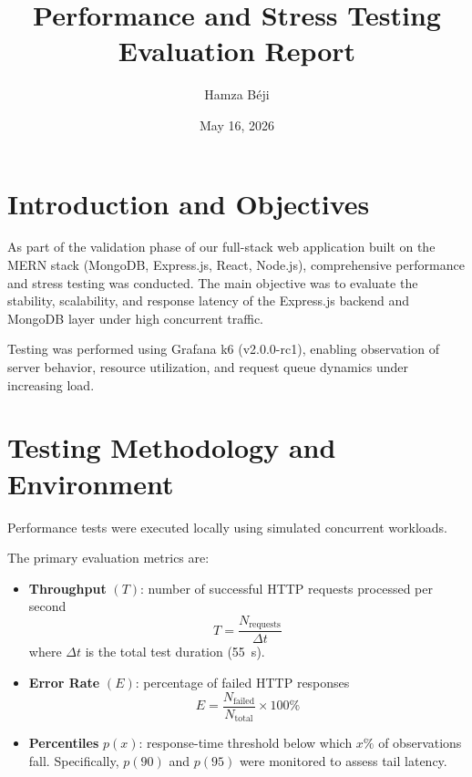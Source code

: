 \documentclass[12pt,a4paper]{article}
\title{Performance and Stress Testing Evaluation Report}
\author{Hamza Béji}
\date{May 16, 2026}
\begin{document}
\maketitle
\tableofcontents
\newpage

\section{Introduction and Objectives}

As part of the validation phase of our full-stack web application built on the MERN stack
(MongoDB, Express.js, React, Node.js), comprehensive performance and stress testing was conducted.
The main objective was to evaluate the stability, scalability, and response latency of the
Express.js backend and MongoDB layer under high concurrent traffic.

Testing was performed using Grafana k6 (v2.0.0-rc1), enabling observation of server behavior,
resource utilization, and request queue dynamics under increasing load.

\section{Testing Methodology and Environment}

Performance tests were executed locally using simulated concurrent workloads.

The primary evaluation metrics are:

\begin{itemize}[leftmargin=1.5em]
    \item \textbf{Throughput} $(T)$: number of successful HTTP requests processed per second
    \begin{equation}
        T = \frac{N_{\text{requests}}}{\Delta t}
    \end{equation}
    where $\Delta t$ is the total test duration (\SI{55}{s}).

    \item \textbf{Error Rate} $(E)$: percentage of failed HTTP responses
    \begin{equation}
        E = \frac{N_{\text{failed}}}{N_{\text{total}}} \times 100\%
    \end{equation}

    \item \textbf{Percentiles} $p(x)$: response-time threshold below which $x\%$ of observations fall.
    Specifically, $p(90)$ and $p(95)$ were monitored to assess tail latency.
\end{itemize}
\end{document}
